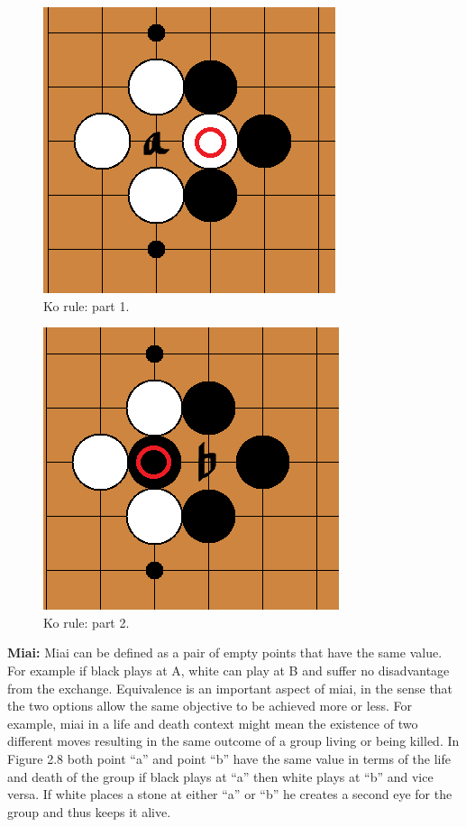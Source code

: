 \documentclass{l3proj}
\begin{document}
\begin{figure}[H]
\centering
\includegraphics[scale=0.5]{Images/korule2.png}
\caption{Ko rule: part 1.}
\end{figure}

\begin{figure}[H]
\centering
\includegraphics[scale=0.5]{Images/korule1.png}
\caption{Ko rule: part 2.}
\end{figure}

\textbf{Miai:} Miai can be defined as a pair of empty points that have the same value. For example if black plays at A, white can play at B and suffer no disadvantage from the exchange. Equivalence is an important aspect of miai, in the sense that the two options allow the same objective to be achieved more or less. For example, miai in a life and death context might mean the existence of two different moves resulting in the same outcome of a group living or being killed. In Figure 2.8 both point “a” and point “b” have the same value in terms of the life and death of the group if black plays at “a” then white plays at “b” and vice versa. If white places a stone at either “a” or “b” he creates a second eye for the group and thus keeps it alive.
\end{document}
